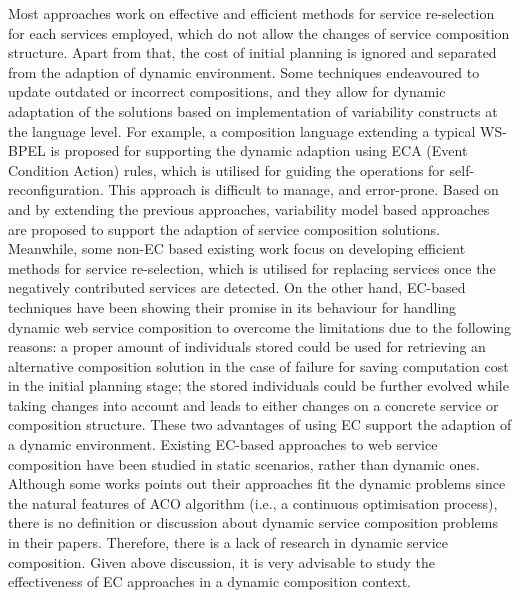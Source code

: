 Most approaches work on effective and efficient methods for service re-selection for each services employed, which do not allow the changes of service composition structure. Apart from that, the cost of initial planning is ignored and separated from the adaption of dynamic environment. Some techniques \cite{andrews2003business,baresi2011self,koning2009vxbpel} endeavoured to update outdated or incorrect compositions, and they allow for dynamic adaptation of the solutions based on implementation of variability constructs at the language level. For example, a composition language extending a typical WS-BPEL \cite{andrews2003business} is proposed for supporting the dynamic adaption using ECA (Event Condition Action) rules, which is utilised for guiding the operations for self-reconfiguration. This approach is difficult to manage, and error-prone. Based on and by extending the previous approaches, variability model based approaches \cite{alferez2014dynamic} are proposed to support the adaption of service composition solutions. Meanwhile, some non-EC based existing work \cite{mohanty2010web,salas2006ws,wagner2016robust,yin2010qos} focus on developing efficient methods for service re-selection, which is utilised for replacing services once the negatively contributed services are detected. On the other hand, EC-based techniques have been showing their promise in its behaviour for handling dynamic web service composition to overcome the limitations due to the following reasons: a proper amount of individuals stored could be used for retrieving an alternative composition solution in the case of failure for saving computation cost in the initial planning stage; the stored individuals could be further evolved while taking changes into account and leads to either changes on a concrete service or composition structure. These two advantages of using EC support the adaption of a dynamic environment. Existing EC-based approaches to web service composition have been studied in static scenarios, rather than dynamic ones. Although some works \cite{feng2013dynamic,liu2005dynamic} points out their approaches fit the dynamic problems since the natural features of ACO algorithm (i.e., a continuous optimisation process), there is no definition or discussion about dynamic service composition problems in their papers. Therefore, there is a lack of research in dynamic service composition. Given above discussion, it is very advisable to study the effectiveness of EC approaches in a dynamic composition context.


